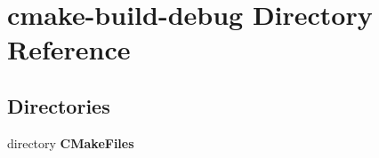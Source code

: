 \section{cmake-\/build-\/debug Directory Reference}
\label{dir_95e29a8b8ee7c54052c171a88bb95675}
\subsection*{Directories}
\begin{DoxyCompactItemize}
\item 
directory {\bf C\+Make\+Files}
\end{DoxyCompactItemize}
